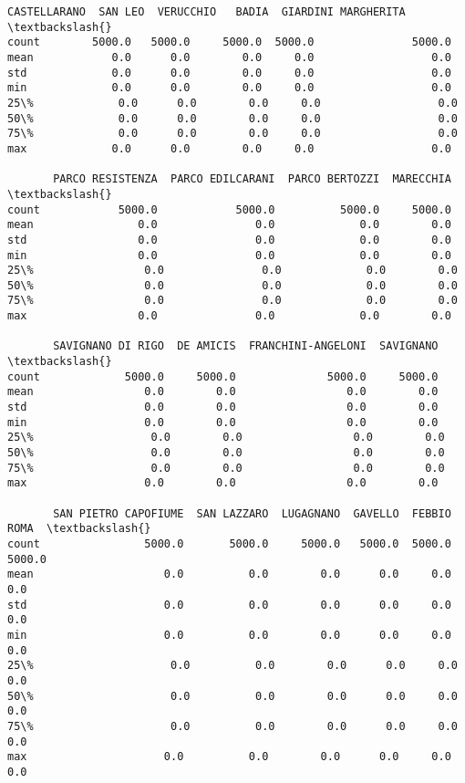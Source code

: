\documentclass[11pt]{article}
\begin{document}
\begin{tcolorbox}[breakable, size=fbox, boxrule=.5pt, pad at break*=1mm, opacityfill=0]
\begin{Verbatim}[commandchars=\\\{\}]
       CASTELLARANO  SAN LEO  VERUCCHIO   BADIA  GIARDINI MARGHERITA  \textbackslash{}
count        5000.0   5000.0     5000.0  5000.0               5000.0
mean            0.0      0.0        0.0     0.0                  0.0
std             0.0      0.0        0.0     0.0                  0.0
min             0.0      0.0        0.0     0.0                  0.0
25\%             0.0      0.0        0.0     0.0                  0.0
50\%             0.0      0.0        0.0     0.0                  0.0
75\%             0.0      0.0        0.0     0.0                  0.0
max             0.0      0.0        0.0     0.0                  0.0

       PARCO RESISTENZA  PARCO EDILCARANI  PARCO BERTOZZI  MARECCHIA  \textbackslash{}
count            5000.0            5000.0          5000.0     5000.0
mean                0.0               0.0             0.0        0.0
std                 0.0               0.0             0.0        0.0
min                 0.0               0.0             0.0        0.0
25\%                 0.0               0.0             0.0        0.0
50\%                 0.0               0.0             0.0        0.0
75\%                 0.0               0.0             0.0        0.0
max                 0.0               0.0             0.0        0.0

       SAVIGNANO DI RIGO  DE AMICIS  FRANCHINI-ANGELONI  SAVIGNANO  \textbackslash{}
count             5000.0     5000.0              5000.0     5000.0
mean                 0.0        0.0                 0.0        0.0
std                  0.0        0.0                 0.0        0.0
min                  0.0        0.0                 0.0        0.0
25\%                  0.0        0.0                 0.0        0.0
50\%                  0.0        0.0                 0.0        0.0
75\%                  0.0        0.0                 0.0        0.0
max                  0.0        0.0                 0.0        0.0

       SAN PIETRO CAPOFIUME  SAN LAZZARO  LUGAGNANO  GAVELLO  FEBBIO    ROMA  \textbackslash{}
count                5000.0       5000.0     5000.0   5000.0  5000.0  5000.0
mean                    0.0          0.0        0.0      0.0     0.0     0.0
std                     0.0          0.0        0.0      0.0     0.0     0.0
min                     0.0          0.0        0.0      0.0     0.0     0.0
25\%                     0.0          0.0        0.0      0.0     0.0     0.0
50\%                     0.0          0.0        0.0      0.0     0.0     0.0
75\%                     0.0          0.0        0.0      0.0     0.0     0.0
max                     0.0          0.0        0.0      0.0     0.0     0.0


\end{Verbatim}
\end{tcolorbox}
\end{document}
